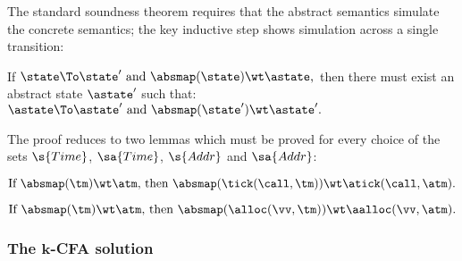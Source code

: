 The standard soundness theorem requires that the abstract semantics
simulate the concrete semantics; the key inductive step shows
simulation across a single transition:
\begin{theorem}
  If 
\(
    \state \To \state' \text{ and } \absmap(\state) \wt \astate
    \text,
    \)
then there must exist an abstract state $\astate'$ such that:
\(
    \astate \To \astate' \text{ and } \absmap(\state') \wt \astate'
    \text.
    \)
\end{theorem}
The proof reduces to two lemmas which must be
proved for every choice of the sets $\s{Time}$, $\sa{Time}$,
$\s{Addr}$ and $\sa{Addr}$:
\begin{lemma}\label{lemma:time-stamp-simulation}
$\text{If } 
  \absmap(\tm) \wt \atm
  \text{, then }
  \absmap(\tick(\call,\tm)) \wt \atick(\call,\atm)
  \text.$
\end{lemma}
\begin{lemma}
\label{lemma:allocator-simulation}
$\text{If } 
  \absmap(\tm) \wt \atm
  \text{, then }
  \absmap(\alloc(\vv,\tm)) \wt \aalloc(\vv,\atm)
  \text.$
\end{lemma}





\subsubsection{The $\boldsymbol k$-CFA solution}

